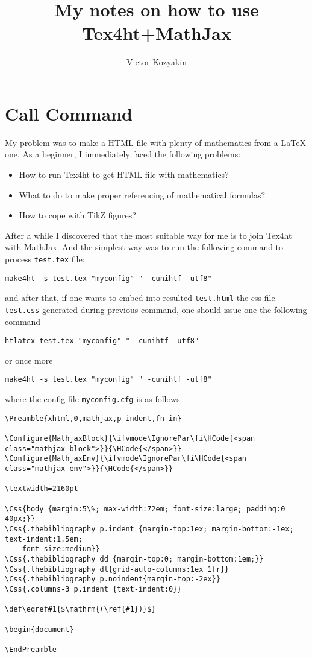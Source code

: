 \documentclass{article}
\title{My notes on how to use Tex4ht+MathJax}
\author{Victor Kozyakin}
\begin{document}
\maketitle

\section{Call Command}\label{S1}
My problem was to make a HTML file with plenty of mathematics from a \LaTeX{}
one. As a beginner, I immediately faced the following problems:
\begin{itemize}
  \item How to run Tex4ht to get HTML file with mathematics?
  \item What to do to make proper referencing of mathematical formulas?
  \item How to cope with TikZ figures?
\end{itemize}

After a while I discovered that the most suitable way for me is to join
Tex4ht with MathJax. And the simplest way was to run the following command to
process \verb|test.tex| file:

{\small
\begin{verbatim}
make4ht -s test.tex "myconfig" " -cunihtf -utf8"
\end{verbatim}}
  \noindent and after that, if one wants to embed into resulted
  \verb|test.html| the css-file \verb|test.css| generated during previous
  command, one should issue one the following command {\small
    \begin{verbatim}
htlatex test.tex "myconfig" " -cunihtf -utf8"
\end{verbatim}
    \noindent or once more
    \begin{verbatim}
make4ht -s test.tex "myconfig" " -cunihtf -utf8"
\end{verbatim}}
    \noindent where the config file \verb|myconfig.cfg| is as
    follows

    {\small
    \begin{verbatim}
\Preamble{xhtml,0,mathjax,p-indent,fn-in}

\Configure{MathjaxBlock}{\ifvmode\IgnorePar\fi\HCode{<span class="mathjax-block">}}{\HCode{</span>}}
\Configure{MathjaxEnv}{\ifvmode\IgnorePar\fi\HCode{<span class="mathjax-env">}}{\HCode{</span>}}

\textwidth=2160pt

\Css{body {margin:5\%; max-width:72em; font-size:large; padding:0 40px;}}
\Css{.thebibliography p.indent {margin-top:1ex; margin-bottom:-1ex; text-indent:1.5em;
    font-size:medium}}
\Css{.thebibliography dd {margin-top:0; margin-bottom:1em;}}
\Css{.thebibliography dl{grid-auto-columns:1ex 1fr}}
\Css{.thebibliography p.noindent{margin-top:-2ex}}
\Css{.columns-3 p.indent {text-indent:0}}

\def\eqref#1{$\mathrm{(\ref{#1})}$}

\begin{document}

\EndPreamble
\end{verbatim}}
\end{document}
